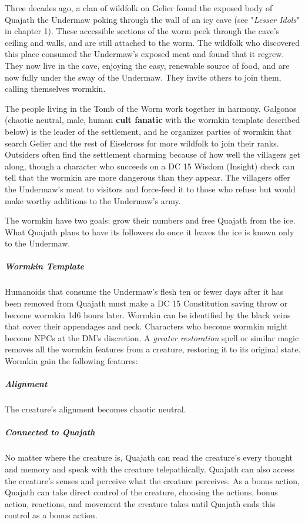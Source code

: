 \documentclass[10pt,a4paper,twoside,bg=print,twocolumn,openany,nodeprecatedcode]{dndbook}
\begin{document}
Three decades ago, a clan of wildfolk on Gelier found the exposed body of Quajath the Undermaw poking through the wall of an icy cave (see "\textit{Lesser Idols}" in chapter 1). These accessible sections of the worm peek through the cave's ceiling and walls, and are still attached to the worm. The wildfolk who discovered this place consumed the Undermaw's exposed meat and found that it regrew. They now live in the cave, enjoying the easy, renewable source of food, and are now fully under the sway of the Undermaw. They invite others to join them, calling themselves wormkin.

The people living in the Tomb of the Worm work together in harmony. Galgonos (chaotic neutral, male, human \textbf{cult fanatic} with the wormkin template described below) is the leader of the settlement, and he organizes parties of wormkin that search Gelier and the rest of Eiselcross for more wildfolk to join their ranks. Outsiders often find the settlement charming because of how well the villagers get along, though a character who succeeds on a DC 15 Wisdom (Insight) check can tell that the wormkin are more dangerous than they appear. The villagers offer the Undermaw's meat to visitors and force-feed it to those who refuse but would make worthy additions to the Undermaw's army.

The wormkin have two goals: grow their numbers and free Quajath from the ice. What Quajath plans to have its followers do once it leaves the ice is known only to the Undermaw.

\subparagraph{Wormkin Template}
Humanoids that consume the Undermaw's flesh ten or fewer days after it has been removed from Quajath must make a DC 15 Constitution saving throw or become wormkin 1d6 hours later. Wormkin can be identified by the black veins that cover their appendages and neck. Characters who become wormkin might become NPCs at the DM's discretion. A \textit{greater restoration} spell or similar magic removes all the wormkin features from a creature, restoring it to its original state. Wormkin gain the following features:

\subparagraph{Alignment}
The creature's alignment becomes chaotic neutral.

\subparagraph{Connected to Quajath}
No matter where the creature is, Quajath can read the creature's every thought and memory and speak with the creature telepathically. Quajath can also access the creature's senses and perceive what the creature perceives. As a bonus action, Quajath can take direct control of the creature, choosing the actions, bonus action, reactions, and movement the creature takes until Quajath ends this control as a bonus action.
\end{document}
